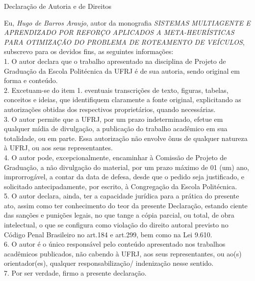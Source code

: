 \begin{center}
Declaração de Autoria e de Direitos
\end{center}

\vspace{0.5cm}

Eu, \emph{Hugo de Barros Araujo}, autor da monografia \emph{SISTEMAS MULTIAGENTE E APRENDIZADO POR REFORÇO APLICADOS A META-HEURÍSTICAS PARA OTIMIZAÇÃO DO PROBLEMA DE ROTEAMENTO DE VEÍCULOS}, subscrevo para os devidos fins, as seguintes informações:\\
1. O autor declara que o trabalho apresentado na disciplina de Projeto de Graduação da Escola Politécnica da UFRJ é de sua autoria, sendo original em forma e conteúdo.\\
2. Excetuam-se do item 1. eventuais transcrições de texto, figuras, tabelas, conceitos e ideias, que identifiquem claramente a fonte original, explicitando as autorizações obtidas dos respectivos proprietários, quando necessárias.\\
3. O autor permite que a UFRJ, por um prazo indeterminado, efetue em qualquer mídia de divulgação, a publicação do trabalho acadêmico em sua totalidade, ou em parte. Essa autorização não envolve ônus de qualquer natureza à UFRJ, ou aos seus representantes.\\
4. O autor pode, excepcionalmente, encaminhar à Comissão de Projeto de Graduação, a não divulgação do material, por um prazo máximo de 01 (um) ano, improrrogável, a contar da data de defesa, desde que o pedido seja justificado, e solicitado antecipadamente, por escrito, à Congregação da Escola Politécnica.\\
5. O autor declara, ainda, ter a capacidade jurídica para a prática do presente ato, assim como ter conhecimento do teor da presente Declaração, estando ciente das sanções e punições legais, no que tange a cópia parcial, ou total, de obra intelectual, o que se configura como violação do direito autoral previsto no Código Penal Brasileiro no art.184 e art.299, bem como na Lei 9.610.\\
6. O autor é o único responsável pelo conteúdo apresentado nos trabalhos acadêmicos publicados, não cabendo à UFRJ, aos seus representantes,  ou ao(s) orientador(es), qualquer responsabilização/ indenização nesse sentido.\\
7. Por ser verdade, firmo a presente declaração.\\

      \vspace{0.5cm}
      \begin{flushright}
         \parbox{10cm}{
            \hrulefill

            \vspace{-.375cm}

            \vspace{0.1cm}
         }
      \end{flushright}
      
